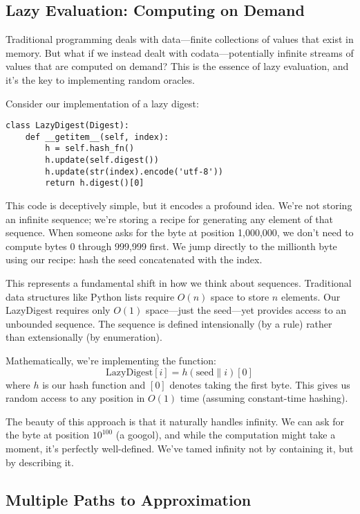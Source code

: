 \documentclass[11pt]{article}
\begin{document}
\subsection{Lazy Evaluation: Computing on Demand}

Traditional programming deals with data---finite collections of values that exist in memory. But what if we instead dealt with codata---potentially infinite streams of values that are computed on demand? This is the essence of lazy evaluation, and it's the key to implementing random oracles.

Consider our implementation of a lazy digest:

\begin{lstlisting}
class LazyDigest(Digest):
    def __getitem__(self, index):
        h = self.hash_fn()
        h.update(self.digest())
        h.update(str(index).encode('utf-8'))
        return h.digest()[0]
\end{lstlisting}

This code is deceptively simple, but it encodes a profound idea. We're not storing an infinite sequence; we're storing a recipe for generating any element of that sequence. When someone asks for the byte at position 1,000,000, we don't need to compute bytes 0 through 999,999 first. We jump directly to the millionth byte using our recipe: hash the seed concatenated with the index.

This represents a fundamental shift in how we think about sequences. Traditional data structures like Python lists require $O(n)$ space to store $n$ elements. Our LazyDigest requires only $O(1)$ space---just the seed---yet provides access to an unbounded sequence. The sequence is defined intensionally (by a rule) rather than extensionally (by enumeration).

Mathematically, we're implementing the function:
$$\text{LazyDigest}[i] = h(\text{seed} \| i)[0]$$
where $h$ is our hash function and $[0]$ denotes taking the first byte. This gives us random access to any position in $O(1)$ time (assuming constant-time hashing).

The beauty of this approach is that it naturally handles infinity. We can ask for the byte at position $10^{100}$ (a googol), and while the computation might take a moment, it's perfectly well-defined. We've tamed infinity not by containing it, but by describing it.

\subsection{Multiple Paths to Approximation}
\end{document}
